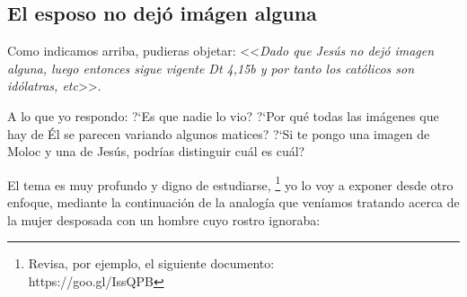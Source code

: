 \documentclass{article}
\begin{document}
\subsection{El esposo no dej\'o im\'agen alguna}

Como indicamos arriba, pudieras objetar: <<\emph{Dado que Jes\'us no dej\'o imagen alguna, luego entonces sigue vigente Dt 4,15b y por tanto los cat\'olicos son id\'olatras, etc}>>.

A lo que yo respondo: ?`Es que nadie lo vio? ?`Por qu\'e todas las im\'agenes que hay de \'El se parecen variando algunos matices? ?`Si te pongo una imagen de Moloc y una de Jes\'us, podr\'{i}as distinguir cu\'al es cu\'al?

El tema es muy profundo y digno de estudiarse,%
    \footnote{Revisa, por ejemplo, el siguiente documento:\\
    https://goo.gl/IssQPB}
yo lo voy a exponer desde otro enfoque, mediante la continuaci\'on de la analog\'{i}a que ven\'{i}amos tratando acerca de la mujer desposada con un hombre cuyo rostro ignoraba:
\end{document}
